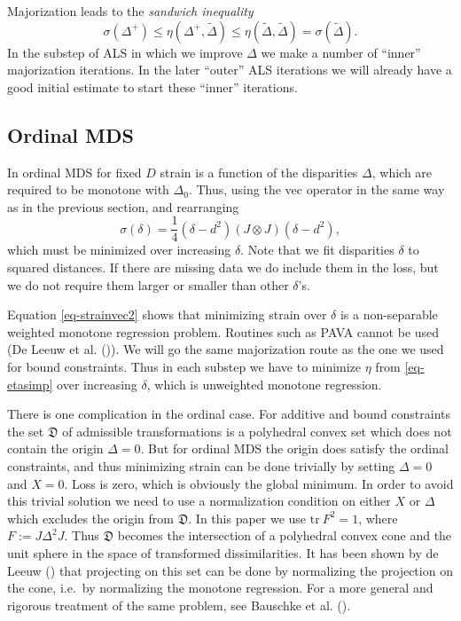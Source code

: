 \documentclass[
  12pt,
  letterpaper,
  DIV=11,
  numbers=noendperiod]{scrartcl}
\begin{document}
Majorization leads to the \emph{sandwich inequality} \begin{equation}
\sigma(\Delta^+)\leq\eta(\Delta^+,\tilde\Delta)\leq\eta(\tilde\Delta,\tilde\Delta)=\sigma(\tilde\Delta).\label{eq-sandwich}
\end{equation} In the substep of ALS in which we improve \(\Delta\) we
make a number of ``inner'' majorization iterations. In the later
``outer'' ALS iterations we will already have a good initial estimate to
start these ``inner'' iterations.

\subsection{Ordinal MDS}\label{ordinal-mds}

In ordinal MDS for fixed \(D\) strain is a function of the disparities
\(\Delta\), which are required to be monotone with \(\Delta_0\). Thus,
using the vec operator in the same way as in the previous section, and
rearranging \begin{equation}
\sigma(\delta)=\frac14(\delta - d^2)(J\otimes J)(\delta - d^2)\label{eq-strainvec2},
\end{equation} which must be minimized over increasing \(\delta\). Note
that we fit disparities \(\delta\) to squared distances. If there are
missing data we do include them in the loss, but we do not require them
larger or smaller than other \(\delta\)'s.

Equation \eqref{eq-strainvec2} shows that minimizing strain over
\(\delta\) is a non-separable weighted monotone regression problem.
Routines such as PAVA cannot be used (De Leeuw et al.
()). We will go the same
majorization route as the one we used for bound constraints. Thus in
each substep we have to minimize \(\eta\) from \eqref{eq-etasimp} over
increasing \(\delta\), which is unweighted monotone regression.

There is one complication in the ordinal case. For additive and bound
constraints the set \(\mathfrak{D}\) of admissible transformations is a
polyhedral convex set which does not contain the origin \(\Delta=0\).
But for ordinal MDS the origin does satisfy the ordinal constraints, and
thus minimizing strain can be done trivially by setting \(\Delta=0\) and
\(X=0\). Loss is zero, which is obviously the global minimum. In order
to avoid this trivial solution we need to use a normalization condition
on either \(X\) or \(\Delta\) which excludes the origin from
\(\mathfrak{D}\). In this paper we use \(\text{tr}\ F^2=1\), where
\(F:=J\Delta^2 J\). Thus \(\mathfrak{D}\) becomes the intersection of a
polyhedral convex cone and the unit sphere in the space of transformed
dissimilarities. It has been shown by {de Leeuw}
() that projecting on this set can be
done by normalizing the projection on the cone, i.e.~by normalizing the
monotone regression. For a more general and rigorous treatment of the
same problem, see Bauschke et al.
().
\end{document}
